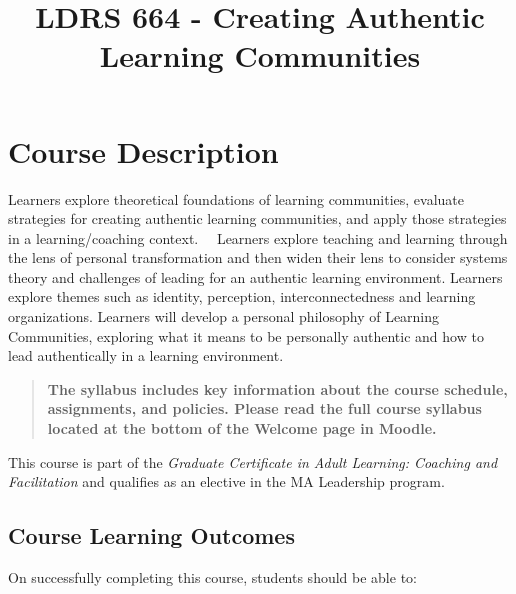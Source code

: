 \documentclass[
]{book}
\title{LDRS 664 - Creating Authentic Learning Communities}
\author{}
\date{\vspace{-2.5em}}
\begin{document}
\maketitle

{
\setcounter{tocdepth}{1}
\tableofcontents
}
\hypertarget{course-description}{%
\chapter*{Course Description}\label{course-description}}

Learners explore theoretical foundations of learning communities, evaluate strategies for creating authentic learning communities, and apply those strategies in a learning/coaching context.~~ Learners explore teaching and learning through the lens of personal transformation and then widen their lens to consider systems theory and challenges of leading for an authentic learning environment. Learners explore themes such as identity, perception, interconnectedness and learning organizations. Learners will develop a personal philosophy of Learning Communities, exploring what it means to be personally authentic and how to lead authentically in a learning environment.~

\begin{quote}
\textbf{The syllabus includes key information about the course schedule, assignments, and policies. Please read the full course syllabus located at the bottom of the Welcome page in Moodle.}
\end{quote}

This course is part of the \emph{Graduate Certificate in Adult Learning: Coaching and Facilitation} and qualifies as an elective in the MA Leadership program.

\hypertarget{course-learning-outcomes}{%
\section*{Course Learning Outcomes}\label{course-learning-outcomes}}

On successfully completing this course, students should be able to:
\end{document}
